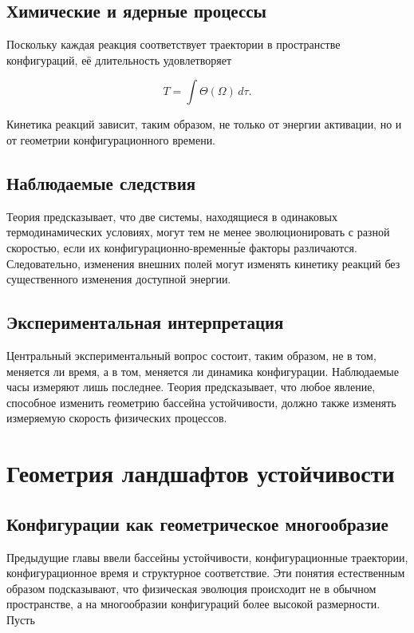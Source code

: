 \section{Химические и ядерные процессы}

Поскольку каждая реакция соответствует траектории в пространстве конфигураций, её длительность удовлетворяет

\[ T = \int \Theta(\Omega) \,d\tau. \]

Кинетика реакций зависит, таким образом, не только от энергии активации, но и от геометрии конфигурационного времени.

\section{Наблюдаемые следствия}

Теория предсказывает, что две системы, находящиеся в одинаковых термодинамических условиях, могут тем не менее эволюционировать с разной скоростью, если их конфигурационно-временны́е факторы различаются. Следовательно, изменения внешних полей могут изменять кинетику реакций без существенного изменения доступной энергии.

\section{Экспериментальная интерпретация}

Центральный экспериментальный вопрос состоит, таким образом, не в том, меняется ли время, а в том, меняется ли динамика конфигурации. Наблюдаемые часы измеряют лишь последнее. Теория предсказывает, что любое явление, способное изменить геометрию бассейна устойчивости, должно также изменять измеряемую скорость физических процессов.

\chapter{Геометрия ландшафтов устойчивости}

\section{Конфигурации как геометрическое многообразие}

Предыдущие главы ввели бассейны устойчивости, конфигурационные траектории, конфигурационное время и структурное соответствие. Эти понятия естественным образом подсказывают, что физическая эволюция происходит не в обычном пространстве, а на многообразии конфигураций более высокой размерности. Пусть

